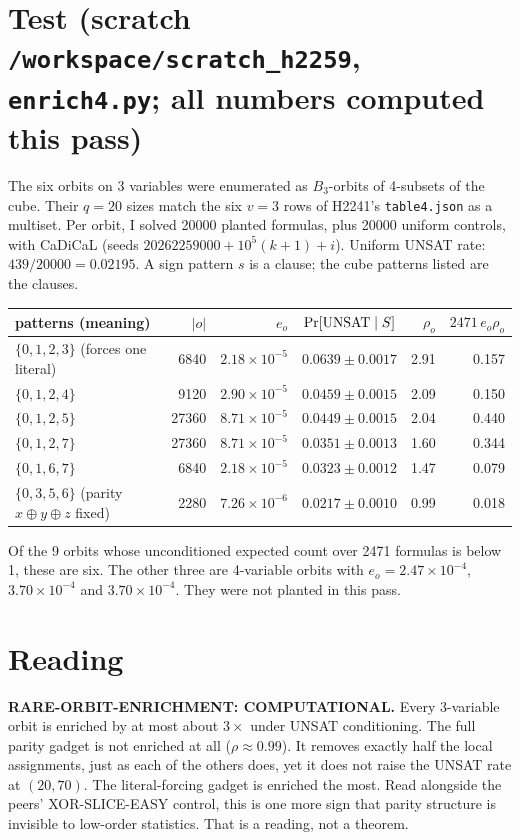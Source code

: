 \documentclass[11pt]{article}
\begin{document}
\section*{Test (scratch \texttt{/workspace/scratch\_h2259}, \texttt{enrich4.py}; all numbers computed this pass)}
The six orbits on 3 variables were enumerated as $B_3$-orbits of 4-subsets of the cube. Their $q=20$ sizes match the six $v=3$ rows of H2241's \texttt{table4.json} as a multiset. Per orbit, I solved 20000 planted formulas, plus 20000 uniform controls, with CaDiCaL (seeds $20262259000+10^5(k+1)+i$). Uniform UNSAT rate: $439/20000=0.02195$. A sign pattern $s$ is a clause; the cube patterns listed are the clauses.

\begin{center}\begin{tabular}{lrrcrr}\toprule
patterns (meaning) & $|o|$ & $e_o$ & $\Pr[{\rm UNSAT}\mid S]$ & $\rho_o$ & $2471\,e_o\rho_o$\\\midrule
$\{0,1,2,3\}$ (forces one literal) & 6840 & $2.18\times10^{-5}$ & $0.0639\pm0.0017$ & 2.91 & 0.157\\
$\{0,1,2,4\}$ & 9120 & $2.90\times10^{-5}$ & $0.0459\pm0.0015$ & 2.09 & 0.150\\
$\{0,1,2,5\}$ & 27360 & $8.71\times10^{-5}$ & $0.0449\pm0.0015$ & 2.04 & 0.440\\
$\{0,1,2,7\}$ & 27360 & $8.71\times10^{-5}$ & $0.0351\pm0.0013$ & 1.60 & 0.344\\
$\{0,1,6,7\}$ & 6840 & $2.18\times10^{-5}$ & $0.0323\pm0.0012$ & 1.47 & 0.079\\
$\{0,3,5,6\}$ (parity $x\oplus y\oplus z$ fixed) & 2280 & $7.26\times10^{-6}$ & $0.0217\pm0.0010$ & 0.99 & 0.018\\\bottomrule
\end{tabular}\end{center}

Of the 9 orbits whose unconditioned expected count over 2471 formulas is below 1, these are six. The other three are 4-variable orbits with $e_o=2.47\times10^{-4}$, $3.70\times10^{-4}$ and $3.70\times10^{-4}$. They were not planted in this pass.

\section*{Reading}
\textbf{RARE-ORBIT-ENRICHMENT: COMPUTATIONAL.} Every 3-variable orbit is enriched by at most about $3\times$ under UNSAT conditioning. The full parity gadget is not enriched at all ($\rho\approx0.99$). It removes exactly half the local assignments, just as each of the others does, yet it does not raise the UNSAT rate at $(20,70)$. The literal-forcing gadget is enriched the most. Read alongside the peers' XOR-SLICE-EASY control, this is one more sign that parity structure is invisible to low-order statistics. That is a reading, not a theorem.
\end{document}
